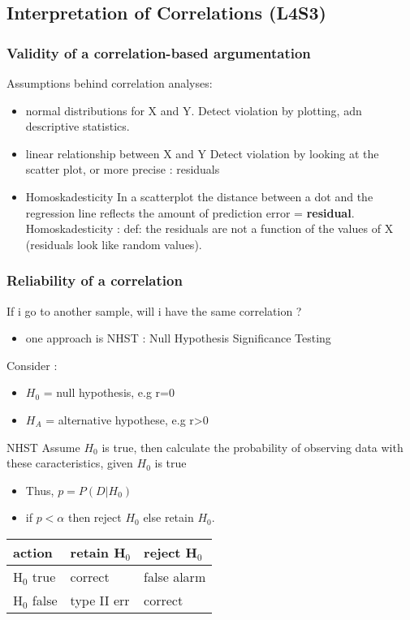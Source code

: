\documentclass[11pt]{article}
\begin{document}
\subsection{Interpretation of Correlations (L4S3)}
\label{sec-2-3}
\subsubsection{Validity of a correlation-based argumentation}
\label{sec-2-3-1}

    Assumptions behind correlation analyses:
\begin{itemize}
\item normal distributions for X and Y. 
      Detect violation by plotting, adn descriptive statistics.
\item linear relationship between X and Y
      Detect violation by looking at the scatter plot, or more precise : residuals
\item Homoskadesticity
      In a scatterplot the distance between a dot and the regression line reflects the amount
      of prediction error = \textbf{residual}.
      Homoskadesticity : def: the residuals are not a function of the values of X
      (residuals look like random values).
\end{itemize}
\subsubsection{Reliability of a correlation}
\label{sec-2-3-2}

    If i go to another sample, will i have the same correlation ?
\begin{itemize}
\item one approach is NHST : Null Hypothesis Significance Testing
\end{itemize}
    Consider :
\begin{itemize}
\item $H_0$ =  null hypothesis, e.g r=0
\item $H_A$ = alternative hypothese, e.g r>0
\end{itemize}
    NHST
    Assume $H_0$ is true, then calculate the probability of observing data with
    these caracteristics, given $H_0$ is true
\begin{itemize}
\item Thus, $p = P(D|H_0)$
\item if $p < \alpha$ then reject $H_0$ else retain $H_0$.
\end{itemize}


\begin{center}
\begin{tabular}{lll}
 action       &  retain H$_0$  &  reject H$_0$  \\
\hline
 H$_0$ true   &  correct       &  false alarm   \\
 H$_0$ false  &  type II err   &  correct       \\
\end{tabular}
\end{center}
\end{document}
